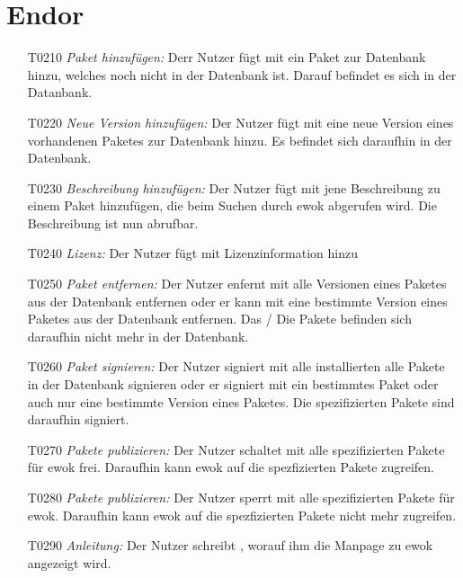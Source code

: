 \section{Endor}

\begin{itemize}
	\item[T0210] \textit{Paket hinzufügen:} Derr Nutzer fügt mit  ein Paket zur Datenbank hinzu, welches noch nicht in der Datenbank ist. Darauf befindet es sich in der Datanbank.
	\item[T0220] \textit{Neue Version hinzufügen:} Der Nutzer fügt mit  eine neue Version eines vorhandenen Paketes zur Datenbank hinzu. Es befindet sich daraufhin in der Datenbank.
	\item[T0230] \textit{Beschreibung hinzufügen:} Der Nutzer fügt mit  jene Beschreibung zu einem Paket hinzufügen, die beim Suchen durch ewok abgerufen wird. Die Beschreibung ist nun abrufbar.
	\item[T0240] \textit{Lizenz:} Der Nutzer fügt mit  Lizenzinformation hinzu
	\item[T0250] \textit{Paket entfernen:} Der Nutzer enfernt mit  alle Versionen eines Paketes aus der Datenbank entfernen oder er kann mit  eine bestimmte Version eines Paketes aus der Datenbank entfernen. Das / Die Pakete befinden sich daraufhin nicht mehr in der Datenbank.
	\item[T0260] \textit{Paket signieren:} Der Nutzer signiert mit  alle installierten alle Pakete in der Datenbank signieren oder er signiert mit  ein bestimmtes Paket oder auch nur eine bestimmte Version eines Paketes. Die spezifizierten Pakete sind daraufhin signiert.
	\item[T0270] \textit{Pakete publizieren:} Der Nutzer schaltet mit  alle spezifizierten Pakete für ewok frei. Daraufhin kann ewok auf die spezfizierten Pakete zugreifen.
	\item[T0280] \textit{Pakete publizieren:} Der Nutzer sperrt mit  alle spezifizierten Pakete für ewok. Daraufhin kann ewok auf die spezfizierten Pakete nicht mehr zugreifen.
	\item[T0290] \textit{Anleitung:} Der Nutzer schreibt , worauf ihm die Manpage zu ewok angezeigt wird.
\end{itemize}

